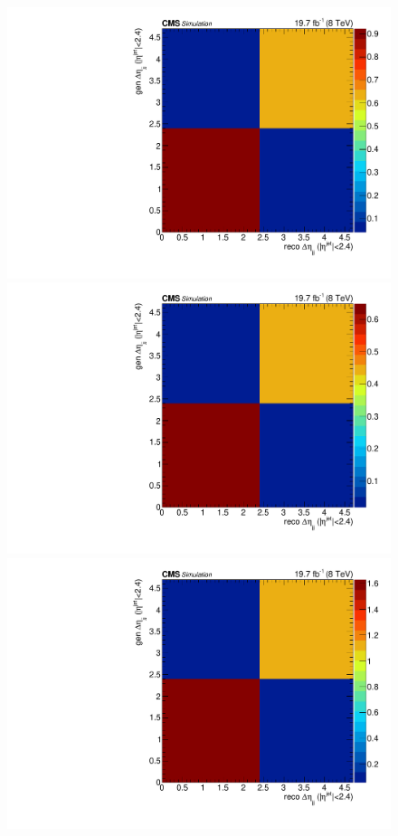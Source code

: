 \begin{figure}[hbtp]
  \begin{center}
    \includegraphics[width=\cmsFigWidth]{Figures/ResMat_qqggJJ_CentralDeta_ZZTo4m_st_01_fr_Mad}
    \includegraphics[width=\cmsFigWidth]{Figures/ResMat_qqggJJ_CentralDeta_ZZTo4e_st_01_fr_Mad}
    \includegraphics[width=\cmsFigWidth]{Figures/ResMat_qqggJJ_CentralDeta_ZZTo2e2m_st_01_fr_Mad}     

\end{center}
\end{figure}
